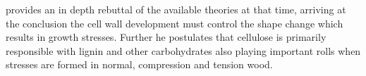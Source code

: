 \citet{ISI:A1950XU10300003} provides an in depth rebuttal of the available theories at that
time, arriving at the conclusion the cell wall development must control the shape
change which results in growth stresses. Further he postulates that cellulose
is primarily responsible with lignin and other carbohydrates also playing important
rolls when stresses are formed in normal, compression and tension wood. 